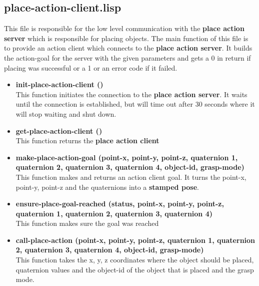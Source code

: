 \documentclass[main.tex]{subfiles}
\begin{document}
        \subsection{place-action-client.lisp}
        This file is responsible for the low level communication with the \textbf{place action server} which is responsible for placing objects. The main function of this file is to provide an action client which connects to the \textbf{place action server}. It builds the action-goal for the server with the given parameters and gets a 0 in return if placing was successful or a 1  or an error code if it failed. 
        \begin{itemize}
            \item \textbf{init-place-action-client ()} \\
            This function initiates the connection to the \textbf{place action server}. It waits until the connection is established, but will time out after 30 seconds where it will stop waiting and shut down. 
            \item \textbf{get-place-action-client ()} \\
            This function returns the \textbf{place action client}
            \item \textbf{make-place-action-goal (point-x, point-y, point-z, quaternion 1, quaternion 2, quaternion 3, quaternion 4, object-id, grasp-mode)} \\
            This function makes and returns an action client goal. It turns the point-x, point-y, point-z and the quaternions into a \textbf{stamped pose}.                
            \item \textbf{ensure-place-goal-reached (status, point-x, point-y, point-z, quaternion 1, quaternion 2, quaternion 3, quaternion 4)} \\
            This function makes sure the goal was reached
            \item \textbf{call-place-action (point-x, point-y, point-z, quaternion 1, quaternion 2, quaternion 3, quaternion 4, object-id, grasp-mode)} \\
            This function takes the x, y, z coordinates where the object should be placed, quaternion values  and the object-id of the object that is placed and the grasp mode.
        \end{itemize}
\end{document}
